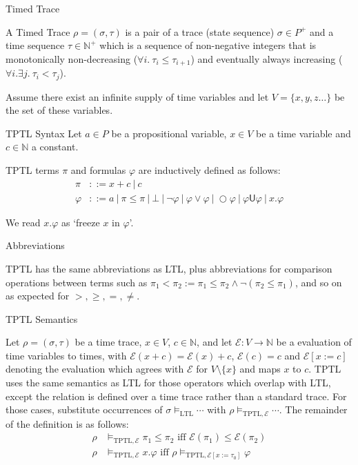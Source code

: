 \documentclass[a4paper]{article}
\newcommand{\U}{\mathsf{U}}
\newcommand{\tiff}{\text{ iff }}
\newcommand{\eval}{\mathcal{E}}
\begin{document}


\begin{defn}{Timed Trace}

  A Timed Trace $\rho = (\sigma,\tau)$ is a pair of a trace (state sequence) $\sigma \in P^+$ and a time sequence $\tau \in \mathbb{N}^+$ which is a sequence of non-negative integers that is monotonically non-decreasing ($\forall i. ~\tau_i \leq \tau_{i+1}$) and eventually always increasing ($\forall i. \exists j. ~\tau_i < \tau_j$).
\end{defn}

Assume there exist an infinite supply of time variables  and let $V=\{x,y,z\dots\}$ be the set of these variables.

\begin{defn}{TPTL Syntax}\label{tptlsyn}
  Let $a\in P$ be a propositional variable, $x\in V$ be a time variable and $c\in\mathbb{N}$ a constant.

  TPTL terms $\pi$ and formulas $\varphi$ are inductively defined as follows:
  \begin{align*}
    \pi &::= x + c ~|~ c\\
    \varphi &::= a ~|~ \pi \leq \pi ~|~ \bot ~|~ \neg \varphi ~|~\varphi \lor \varphi ~|~ \bigcirc \varphi ~|~ \varphi \U \varphi ~|~ x. \varphi
  \end{align*}
\end{defn}

We read $x. \varphi$ as `freeze $x$ in $\varphi$'.

\begin{notn}{Abbreviations}\label{tptlabbrev}

  TPTL has the same abbreviations as LTL, plus abbreviations for comparison operations between terms such as $\pi_1 < \pi_2 := \pi_1 \leq \pi_2 \land \neg(\pi_2 \leq \pi_1)$, and so on as expected for $>,\geq,=,\neq$.
\end{notn}

\begin{defn}{TPTL Semantics}\label{tptlsem}

  Let $\rho = (\sigma,\tau)$ be a time trace, $x\in V$, $c\in\mathbb{N}$, and let $\eval:V\to\mathbb{N}$ be a evaluation of time variables to times, with $\eval(x + c) = \eval(x) + c$, $\eval(c) = c$ and $\eval[x:=c]$ denoting the evaluation which agrees with $\eval$ for $V\setminus\{x\}$ and maps $x$ to $c$.
  TPTL uses the same semantics as LTL for those operators which overlap with LTL, except the relation is defined over a time trace rather than a standard trace. For those cases, substitute occurrences of $\sigma\vDash_{\text{LTL}}\cdots$ with $\rho\vDash_{\text{TPTL},\eval}\cdots$. The remainder of the definition is as follows:
  \begin{align*}
    \rho&\vDash_{\text{TPTL},\eval}\pi_1\leq\pi_2 \tiff \eval(\pi_1)\leq\eval(\pi_2)\\
    \rho&\vDash_{\text{TPTL},\eval} x.\varphi \tiff \rho\vDash_{\text{TPTL},\eval[x:=\tau_0]}\varphi
  \end{align*}
\end{defn}
\end{document}
